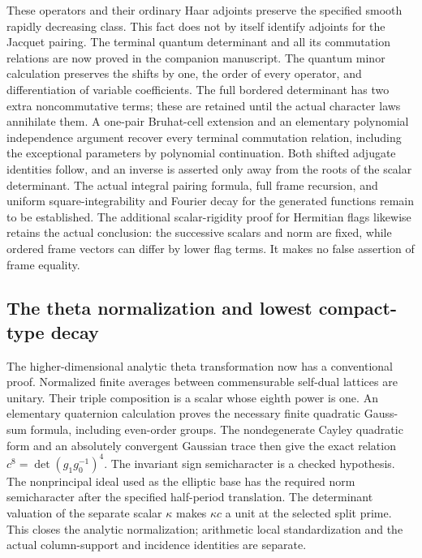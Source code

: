 \documentclass[11pt,a4paper]{article}
\theoremstyle{remark}
\begin{document}
These operators and their ordinary Haar adjoints preserve the
specified smooth rapidly decreasing class. This fact does not
by itself identify adjoints for the Jacquet pairing.
The terminal quantum determinant and all its commutation relations
are now proved in the companion manuscript. The quantum
minor calculation preserves the shifts by one, the order of
every operator, and differentiation of variable coefficients.
The full bordered determinant has two extra noncommutative terms;
these are retained until the actual character laws annihilate them.
A one-pair Bruhat-cell extension and an elementary polynomial
independence argument recover every terminal commutation relation,
including the exceptional parameters by polynomial continuation.
Both shifted adjugate identities follow, and an inverse is asserted
only away from the roots of the scalar determinant.
The actual integral pairing formula, full frame recursion, and
uniform square-integrability and Fourier decay for the generated
functions remain to be established.
The additional scalar-rigidity proof for Hermitian flags likewise
retains the actual conclusion: the successive scalars and norm
are fixed, while ordered frame vectors can differ by lower
flag terms. It makes no false assertion of frame equality.

\subsection{The theta normalization and lowest compact-type decay}

The higher-dimensional analytic theta transformation now has
a conventional proof. Normalized finite averages between
commensurable self-dual lattices are unitary. Their triple
composition is a scalar whose eighth power is one.
An elementary quaternion calculation proves the necessary finite
quadratic Gauss-sum formula, including even-order groups.
The nondegenerate Cayley quadratic form and an absolutely
convergent Gaussian trace then give the exact relation
$c^8=\det(g_1g_0^{-1})^4$.
The invariant sign semicharacter is a checked hypothesis.
The nonprincipal ideal used as the elliptic base has the
required norm semicharacter after the specified half-period
translation. The determinant valuation of the separate scalar
$\kappa$ makes $\kappa c$ a unit at the selected split prime.
This closes the analytic normalization; arithmetic local
standardization and the actual column-support and incidence
identities are separate.
\end{document}
